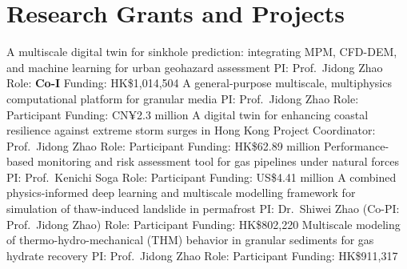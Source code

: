 \documentclass[10pt]{article}
\begin{document}
\section{Research Grants and Projects}
  {A multiscale digital twin for sinkhole prediction: integrating MPM, CFD-DEM, and machine learning for urban geohazard assessment}
  {PI: Prof.\ Jidong Zhao \factsep Role: \textbf{\color{ink}Co-I} \factsep Funding: HK\$1,014,504}
  {A general-purpose multiscale, multiphysics computational platform for granular media}
  {PI: Prof.\ Jidong Zhao \factsep Role: Participant \factsep Funding: CN¥2.3 million}
  {A digital twin for enhancing coastal resilience against extreme storm surges in Hong Kong}
  {Project Coordinator: Prof.\ Jidong Zhao \factsep Role: Participant \factsep Funding: HK\$62.89 million}
  {Performance-based monitoring and risk assessment tool for gas pipelines under natural forces}
  {PI: Prof.\ Kenichi Soga \factsep Role: Participant \factsep Funding: US\$4.41 million}
  {A combined physics-informed deep learning and multiscale modelling framework for simulation of thaw-induced landslide in permafrost}
  {PI: Dr.\ Shiwei Zhao (Co-PI: Prof.\ Jidong Zhao) \factsep Role: Participant \factsep Funding: HK\$802,220}
  {Multiscale modeling of thermo-hydro-mechanical (THM) behavior in granular sediments for gas hydrate recovery}
  {PI: Prof.\ Jidong Zhao \factsep Role: Participant \factsep Funding: HK\$911,317}

\end{document}
